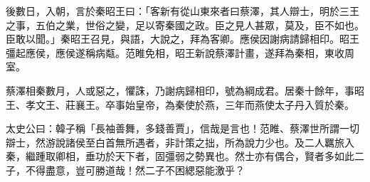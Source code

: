 \begin{pinyinscope}
後數日，入朝，言於秦昭王曰：「客新有從山東來者曰蔡澤，其人辯士，明於三王之事，五伯之業，世俗之變，足以寄秦國之政。臣之見人甚眾，莫及，臣不如也。臣敢以聞。」秦昭王召見，與語，大說之，拜為客卿。應侯因謝病請歸相印。昭王彊起應侯，應侯遂稱病甐。范睢免相，昭王新說蔡澤計畫，遂拜為秦相，東收周室。

蔡澤相秦數月，人或惡之，懼誅，乃謝病歸相印，號為綱成君。居秦十餘年，事昭王、孝文王、莊襄王。卒事始皇帝，為秦使於燕，三年而燕使太子丹入質於秦。

太史公曰：韓子稱「長袖善舞，多錢善賈」，信哉是言也！范睢、蔡澤世所謂一切辯士，然游說諸侯至白首無所遇者，非計策之拙，所為說力少也。及二人羈旅入秦，繼踵取卿相，垂功於天下者，固彊弱之勢異也。然士亦有偶合，賢者多如此二子，不得盡意，豈可勝道哉！然二子不困緦惡能激乎？


\end{pinyinscope}